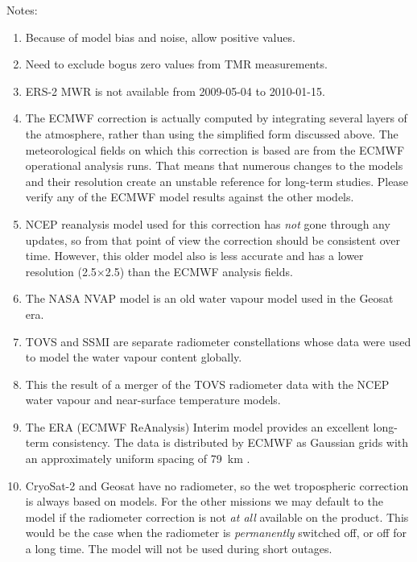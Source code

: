 \documentclass[a4paper,11pt,openany,natbib]{thesis}
\makeatletter
\newcommand\var[1]{\url{#1}\index{variables!#1@\protect\url{#1}}}
\makeatother
\begin{document}
Notes:
\begin{enumerate}
\item Because of model bias and noise, allow positive values.\label{item:wet_tropo_rad_n1}
\item Need to exclude bogus zero values from TMR measurements.\label{item:wet_tropo_rad_tp}
\item ERS-2 MWR is not available from 2009-05-04 to 2010-01-15.\label{item:wet_tropo_rad_e2}
\item The ECMWF correction is actually computed by integrating several layers of the atmosphere, rather than using the simplified form discussed above. The meteorological fields on which this correction is based are from the ECMWF operational analysis runs. That means that numerous changes to the models and their resolution create an unstable reference for long-term studies. Please verify any of the ECMWF model results against the other models.\label{item:wet_tropo_ecmwf}
\item NCEP reanalysis model used for this correction has \emph{not} gone through any updates, so from that point of view the correction should be consistent over time. However, this older model also is less accurate and has a lower resolution (2.5\deg$\times$2.5\deg) than the ECMWF analysis fields.\label{item:wet_tropo_ncep}
\item The NASA NVAP model is an old water vapour model used in the Geosat era.\label{item:wet_tropo_nvap}
\item TOVS and SSMI are separate radiometer constellations whose data were used to model the water vapour content globally.\label{item:wet_tropo_tovs_ssmi}
\item This the result of a merger of the TOVS radiometer data with the NCEP water vapour and near-surface temperature models.\label{item:wet_tropo_tovs_ncep}
\item The ERA (ECMWF ReAnalysis) Interim model provides an excellent long-term consistency. The data is distributed by ECMWF as Gaussian grids with an approximately uniform spacing of 79~km \citep{berrisford2011}.\label{item:wet_tropo_era}
\item CryoSat-2 and Geosat have no radiometer, so the wet tropospheric correction is always based on models. For the other missions we may default to the model if the radiometer correction is not \emph{at all} available on the product. This would be the case when the radiometer is \emph{permanently} switched off, or off for a long time. The model will not be used during short outages.\label{item:wet_tropo}
\end{enumerate}
\end{document}
